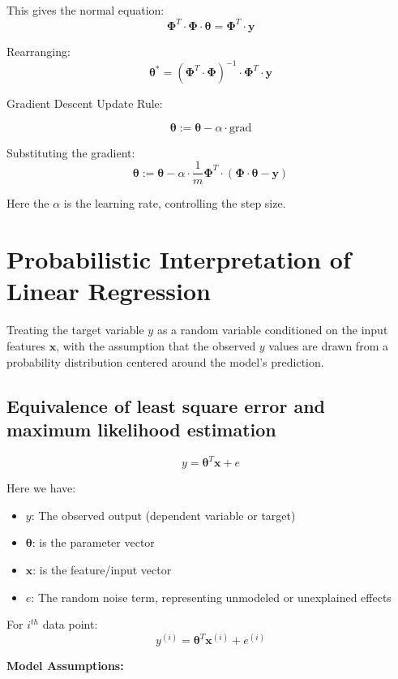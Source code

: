This gives the normal equation:
\[
\boldsymbol{\Phi}^T \cdot \boldsymbol{\Phi} \cdot \boldsymbol{\theta} = \boldsymbol{\Phi}^T \cdot \mathbf{y}
\]

Rearranging:
\[
\boldsymbol{\theta}^* = (\boldsymbol{\Phi}^T \cdot \boldsymbol{\Phi})^{-1} \cdot \boldsymbol{\Phi}^T \cdot \mathbf{y}
\]


Gradient Descent Update Rule:

\[
\boldsymbol{\theta} := \boldsymbol{\theta} - \alpha \cdot \text{grad}
\]

Substituting the gradient:
\[
\boldsymbol{\theta} := \boldsymbol{\theta} - \alpha \cdot \frac{1}{m} \boldsymbol{\Phi}^T \cdot (\boldsymbol{\Phi} \cdot
\boldsymbol{\theta} - \mathbf{y})
\]

Here the \(\alpha\) is the learning rate, controlling the step size.

\section{Probabilistic Interpretation of Linear Regression}

Treating the target variable \(y\) as a random variable conditioned on the input features \(\mathbf{x}\), with the
assumption that the observed \(y\) values are drawn from a probability distribution centered around the model's
prediction.

\subsection{Equivalence of least square error and maximum likelihood estimation}
\[
    y = \boldsymbol{\theta}^T \mathbf{x} + e
\]

Here we have:
\begin{itemize}
    \item \( y \): The observed output (dependent variable or target)
    \item \( \boldsymbol{\theta} \): is the parameter vector
    \item \( \mathbf{x} \): is the feature/input vector
    \item \( e \): The random noise term, representing unmodeled or unexplained effects
\end{itemize}

For $i^{th}$ data point:
\[
    y^{(i)} = \boldsymbol{\theta}^T \mathbf{x}^{(i)} + e^{(i)}
\]

\noindent
\textbf{Model Assumptions:}

